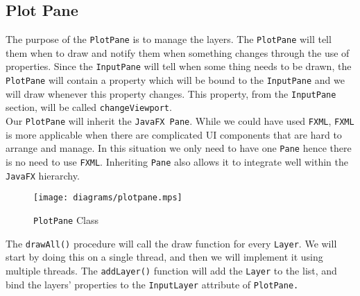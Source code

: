 \documentclass[../../../../../main.tex]{subfiles}
\begin{document}
\subsection{Plot Pane}
The purpose of the \texttt{PlotPane} is to manage the layers. The \texttt{PlotPane} will tell them when to draw and notify them when something changes through the use of properties. Since the \texttt{InputPane} will tell when some thing needs to be drawn, the \texttt{PlotPane} will contain a property which will be bound to the \texttt{InputPane} and we will draw whenever this property changes. This property, from the \texttt{InputPane} section, will be called \texttt{changeViewport}.\\
Our \texttt{PlotPane} will inherit the \texttt{JavaFX Pane}. While we could have used \texttt{FXML}, \texttt{FXML} is more applicable when there are complicated UI components that are hard to arrange and manage. In this situation we only need to have one \texttt{Pane} hence there is no need to use \texttt{FXML}. Inheriting \texttt{Pane} also allows it to integrate well within the \texttt{JavaFX} hierarchy.

\begin{figure}[H]
	\centering
	\texttt{[image: diagrams/plotpane.mps]}
	\caption{\texttt{PlotPane} Class}
\end{figure}

The \texttt{drawAll()} procedure will call the draw function for every \texttt{Layer}. We will start by doing this on a single thread, and then we will implement it using multiple threads.  The \texttt{addLayer()} function will add the \texttt{Layer} to the list, and bind the layers' properties to the \texttt{InputLayer} attribute of \texttt{PlotPane.}
\newpage
\end{document}
